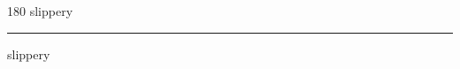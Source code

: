 
\begin{frame}
\begin{center}
\begin{turn}{180}
{\fontsize{2.5cm}{1em}\selectfont slippery}
\end{turn}
\vspace{1em}\par  
\hrule
\vspace{1em}\par  
{\fontsize{2.5cm}{1em}\selectfont slippery}
\end{center}
\end{frame}
